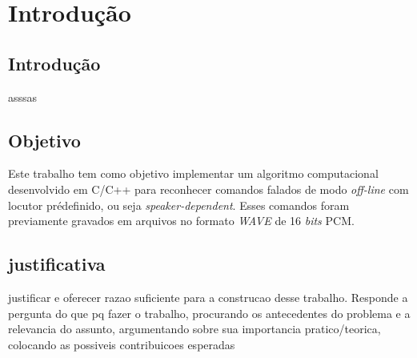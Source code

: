 \documentclass[a4paper,12pt,twoside,openright]{report}
\begin{document}
\chapter{Introdu\c{c}\~{a}o}
\thispagestyle{myheadings}
\pagestyle{myheadings}
\section{Introdu\c{c}\~{a}o}
\label{cap1}
\par asssas
\section{Objetivo}
\par Este trabalho tem como objetivo implementar um algoritmo computacional desenvolvido em C/C++ para reconhecer comandos falados de modo \textit{off-line} com locutor pr\'{e}definido, ou seja \textit{speaker-dependent}. Esses comandos foram previamente gravados em arquivos no formato \textit{WAVE} de 16 \textit{bits} PCM.

\section{justificativa}
\par justificar e oferecer razao suficiente para a construcao desse trabalho. Responde a pergunta do que pq fazer o trabalho, procurando os antecedentes do problema e a relevancia do assunto, argumentando sobre sua importancia pratico/teorica, colocando as possiveis contribuicoes esperadas

\end{document}

